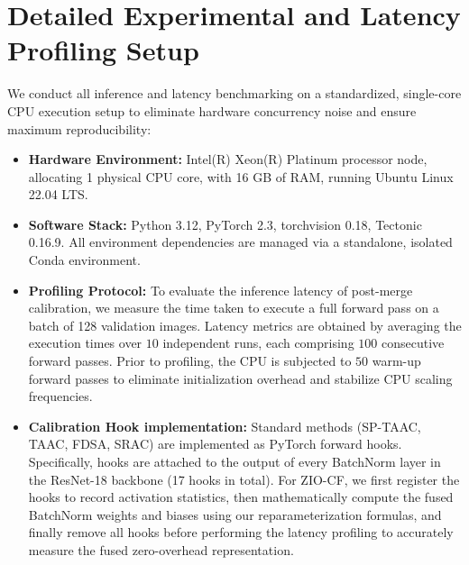 \documentclass{article}
\theoremstyle{plain}
\theoremstyle{definition}
\theoremstyle{remark}
\begin{document}
\section{Detailed Experimental and Latency Profiling Setup}
\label{app:profiling}
We conduct all inference and latency benchmarking on a standardized, single-core CPU execution setup to eliminate hardware concurrency noise and ensure maximum reproducibility:
\begin{itemize}
    \item \textbf{Hardware Environment:} Intel(R) Xeon(R) Platinum processor node, allocating 1 physical CPU core, with 16 GB of RAM, running Ubuntu Linux 22.04 LTS.
    \item \textbf{Software Stack:} Python 3.12, PyTorch 2.3, torchvision 0.18, Tectonic 0.16.9. All environment dependencies are managed via a standalone, isolated Conda environment.
    \item \textbf{Profiling Protocol:} To evaluate the inference latency of post-merge calibration, we measure the time taken to execute a full forward pass on a batch of 128 validation images. Latency metrics are obtained by averaging the execution times over $10$ independent runs, each comprising $100$ consecutive forward passes. Prior to profiling, the CPU is subjected to $50$ warm-up forward passes to eliminate initialization overhead and stabilize CPU scaling frequencies.
    \item \textbf{Calibration Hook implementation:} Standard methods (SP-TAAC, TAAC, FDSA, SRAC) are implemented as PyTorch forward hooks. Specifically, hooks are attached to the output of every BatchNorm layer in the ResNet-18 backbone (17 hooks in total). For ZIO-CF, we first register the hooks to record activation statistics, then mathematically compute the fused BatchNorm weights and biases using our reparameterization formulas, and finally remove all hooks before performing the latency profiling to accurately measure the fused zero-overhead representation.
\end{itemize}
\end{document}
